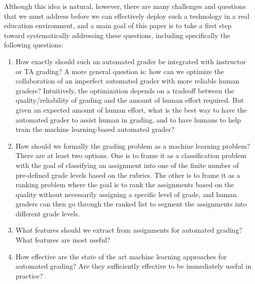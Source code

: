 Although this idea is natural, however, there are many challenges and questions that we must address before we can 
effectively deploy such a technology in a real education environment, and a main goal of this paper is 
to take a first step toward systematically addressing these questions, including specifically the following questions: 
 
\begin{enumerate}
\item How exactly should such an automated grader be integrated with instructor or TA grading? A more general question is: how can we optimize the collaboration of an imperfect automated grader with more reliable human graders? Intuitively, the optimization depends on a tradeoff between the quality/reliability of grading and the amount of human effort required. But given an expected amount of human effort, what is the best way to have the automated grader to assist human in grading, and to have humans to help train the machine learning-based automated grader?

\item How should we formally the grading problem as a machine learning problem? There are at least two options. One is to frame it as a classification problem with the goal of classifying an assignment into one of the finite number of pre-defined grade levels based on the rubrics. The other is to frame it as a ranking problem where the goal is to rank the assignments based on the quality without necessarily assigning a specific level of grade, and human graders can then go through the ranked list to segment the assignments into different grade levels. 

\item What features should we extract from assignments for automated grading? What features are most useful? 

\item How effective are the state of the art machine learning approaches for automated grading? Are they sufficiently effective to be immediately useful in practice? 

\end{enumerate}

